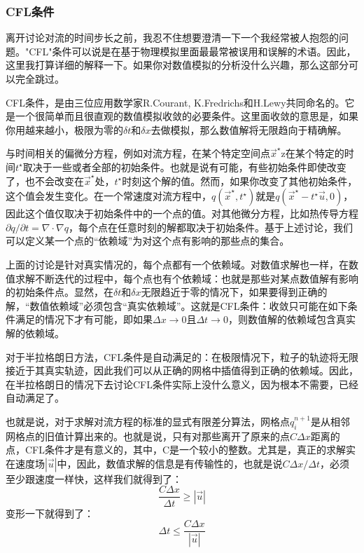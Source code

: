 \documentclass{article}
\begin{document}
\subsubsection{CFL条件}
离开讨论对流的时间步长之前，我忍不住想要澄清一下一个我经常被人抱怨的问题。"CFL"条件可以说是在基于物理模拟里面最最常被误用和误解的术语。因此，这里我打算详细的解释一下。如果你对数值模拟的分析没什么兴趣，那么这部分可以完全跳过。
\par
CFL条件，是由三位应用数学家R.Courant, K.Fredrichs和H.Lewy共同命名的。它是一个很简单而且很直观的数值模拟收敛的必要条件。这里面收敛的意思是，如果你用越来越小，极限为零的$\delta{t}$和$\delta{x}$去做模拟，那么数值解将无限趋向于精确解。
\par
与时间相关的偏微分方程，例如对流方程，在某个特定空间点$\vec{x}^\star$z在某个特定的时间$t^\star$取决于一些或者全部的初始条件。也就是说有可能，有些初始条件即使改变了，也不会改变在$\vec{x}^\star$处，$t^\star$时刻这个解的值。然而，如果你改变了其他初始条件，这个值会发生变化。在一个常速度对流方程中，$q(\vec{x}^\star,t^\star)$就是$q(\vec{x}^\star-t^\star \vec{u},0)$，因此这个值仅取决于初始条件中的一个点的值。对其他微分方程，比如热传导方程$\partial{q}/\partial{t}=\nabla\cdot\nabla{q}$，每个点在任意时刻的解都取决于初始条件。基于上述讨论，我们可以定义某一个点的“依赖域”为对这个点有影响的那些点的集合。
\par
上面的讨论是针对真实情况的，每个点都有一个依赖域。对数值求解也一样，在数值求解不断迭代的过程中，每个点也有个依赖域：也就是那些对某点数值解有影响的初始条件点。显然，在$\delta{t}$和$\delta{x}$无限趋近于零的情况下，如果要得到正确的解，“数值依赖域”必须包含“真实依赖域”。这就是CFL条件：收敛只可能在如下条件满足的情况下才有可能，即如果$\Delta{x}\to{0}$且$\Delta{t}\to{0}$，则数值解的依赖域包含真实解的依赖域。
\par
对于半拉格朗日方法，CFL条件是自动满足的：在极限情况下，粒子的轨迹将无限接近于其真实轨迹，因此我们可以从正确的网格中插值得到正确的依赖域。因此，在半拉格朗日的情况下去讨论CFL条件实际上没什么意义，因为根本不需要，已经自动满足了。
\par
也就是说，对于求解对流方程的标准的显式有限差分算法，网格点$q_i^{n+1}$是从相邻网格点的旧值计算出来的。也就是说，只有对那些离开了原来的点$C\Delta{x}$距离的点，CFL条件才是有意义的，其中，C是一个较小的整数。尤其是，真正的求解实在速度场$|\vec{u}|$中，因此，数值求解的信息是有传输性的，也就是说$C\Delta{x}/\Delta{t}$，必须至少跟速度一样快，这样我们就得到了：
\begin{equation}
\frac{C\Delta{x}}{\Delta{t}}\ge{|\vec{u}|}
\end{equation}
变形一下就得到了：
\begin{equation}
\Delta{t}\le{\frac{C\Delta{x}}{|\vec{u}|}}  \label{CFL_last}
\end{equation}
\end{document}
